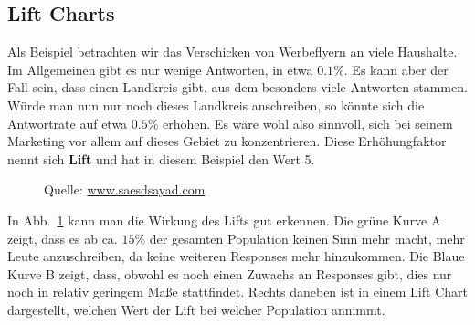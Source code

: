 \subsection{Lift Charts}
Als Beispiel betrachten wir das Verschicken von Werbeflyern an viele Haushalte. Im Allgemeinen
gibt es nur wenige Antworten, in etwa \(0.1\%\). Es kann aber der Fall sein, dass
einen Landkreis gibt, aus dem besonders viele Antworten stammen. Würde man nun
nur noch dieses Landkreis anschreiben, so könnte sich die Antwortrate auf etwa
\(0.5\%\) erhöhen. Es wäre wohl also sinnvoll, sich bei seinem Marketing vor allem
auf dieses Gebiet zu konzentrieren. Diese Erhöhungfaktor nennt sich
\textbf{Lift} und hat in diesem Beispiel den Wert 5. 
\begin{figure}[ht]
	\caption{Quelle: \href{http://www.saedsayad.com/model_evaluation_c.htm}{www.saesdsayad.com}}
	\label{fig:lift}
\end{figure}

\noindent In Abb.~\ref{fig:lift}  kann man die Wirkung des Lifts gut erkennen.
Die grüne Kurve A zeigt, dass es ab ca. \(15\%\) der gesamten Population keinen Sinn
mehr macht, mehr Leute anzuschreiben, da keine weiteren Responses mehr hinzukommen.
Die Blaue Kurve B zeigt, dass, obwohl es noch einen Zuwachs an Responses gibt, 
dies nur noch in relativ geringem Maße stattfindet. Rechts daneben ist in einem
Lift Chart dargestellt, welchen Wert der Lift bei welcher Population annimmt.

